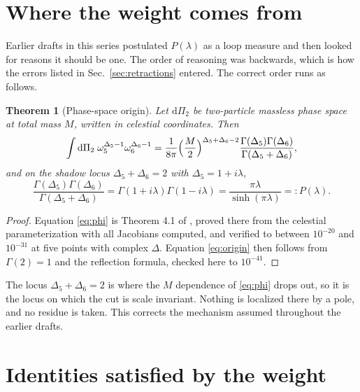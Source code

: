 \documentclass[12pt,a4paper]{article}
\theoremstyle{plain}
\newtheorem{theorem}{Theorem}[section]
\theoremstyle{definition}
\theoremstyle{remark}
\newcommand{\dd}{\mathrm{d}}
\begin{document}
\section{Where the weight comes from}

Earlier drafts in this series postulated $P(\lambda)$ as a loop measure
and then looked for reasons it should be one. The order of reasoning
was backwards, which is how the errors listed in
Sec.~\ref{sec:retractions} entered. The correct order runs as follows.

\begin{theorem}[Phase-space origin]
\label{thm:origin}
Let $\dd\Pi_2$ be two-particle massless phase space at total mass $M$,
written in celestial coordinates. Then
\begin{equation}
\int \dd\Pi_2\;\omega_5^{\Delta_5-1}\omega_6^{\Delta_6-1}
=\frac{1}{8\pi}\Bigl(\frac{M}{2}\Bigr)^{\Delta_5+\Delta_6-2}
\frac{\Gamma(\Delta_5)\Gamma(\Delta_6)}{\Gamma(\Delta_5+\Delta_6)} ,
\label{eq:phi}
\end{equation}
and on the shadow locus $\Delta_5+\Delta_6=2$ with
$\Delta_5=1+i\lambda$,
\begin{equation}
\frac{\Gamma(\Delta_5)\Gamma(\Delta_6)}{\Gamma(\Delta_5+\Delta_6)}
=\Gamma(1+i\lambda)\Gamma(1-i\lambda)
=\frac{\pi\lambda}{\sinh(\pi\lambda)}
=:P(\lambda).
\label{eq:origin}
\end{equation}
\end{theorem}

\begin{proof}
Equation \eqref{eq:phi} is Theorem 4.1 of \cite{ToupinLoops}, proved
there from the celestial parameterization with all Jacobians computed,
and verified to between $10^{-20}$ and $10^{-31}$ at five points with
complex $\Delta$. Equation \eqref{eq:origin} then follows from
$\Gamma(2)=1$ and the reflection formula, checked here to $10^{-41}$.
\end{proof}

The locus $\Delta_5+\Delta_6=2$ is where the $M$ dependence of
\eqref{eq:phi} drops out, so it is the locus on which the cut is scale
invariant. Nothing is localized there by a pole, and no residue is
taken. This corrects the mechanism assumed throughout the earlier
drafts.

\section{Identities satisfied by the weight}
\end{document}
